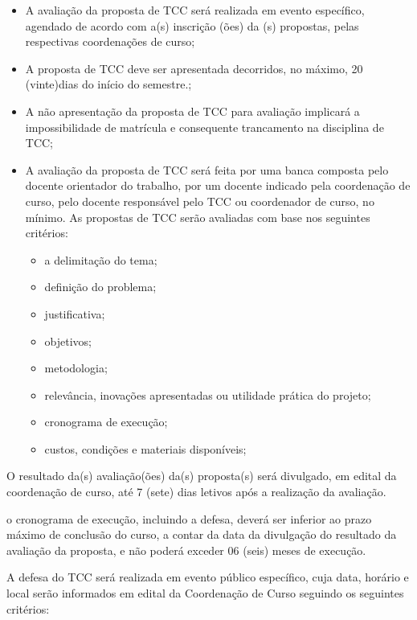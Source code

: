 	 \begin{itemize}
		 \item A avaliação da proposta de TCC será realizada em evento específico, agendado de acordo com a(s) inscrição (ões) da (s) propostas, pelas respectivas coordenações de curso;

		 \item A proposta de TCC deve ser apresentada decorridos, no máximo, 20 (vinte)dias do início do semestre.;

		 \item A não apresentação da proposta de TCC para avaliação implicará a impossibilidade de matrícula e consequente trancamento na disciplina de TCC;

		 \item A avaliação da proposta de TCC será feita por uma banca composta pelo docente orientador do trabalho, por um docente indicado pela coordenação de curso, pelo docente responsável pelo TCC ou coordenador de curso, no mínimo. As propostas de TCC serão avaliadas com base nos seguintes critérios: 
		 \begin{itemize}
		 	\item a delimitação do tema; 
			\item definição do problema; 
			\item justificativa; 
			\item objetivos; 
			\item metodologia; 
			\item relevância, inovações apresentadas ou utilidade prática do projeto; 
			\item cronograma de execução; 
			\item custos, condições e materiais disponíveis; 
		 \end{itemize}
	\end{itemize}
		
O resultado da(s) avaliação(ões) da(s) proposta(s) será divulgado, em edital da coordenação de curso, até 7 (sete) dias letivos após a realização da avaliação. 

o cronograma de execução, incluindo a defesa, deverá ser inferior ao prazo máximo de conclusão do curso, a contar da data da divulgação do resultado da avaliação da proposta, e não poderá exceder 06 (seis) meses de execução. 

 A defesa do TCC será realizada em evento público específico, cuja data, horário e local serão informados em edital da Coordenação de Curso seguindo os seguintes critérios: 
 

